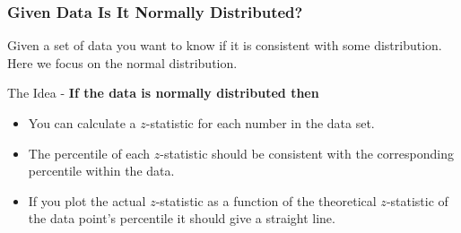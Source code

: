 \begin{frame}
  \frametitle{Given Data Is It Normally Distributed?}

  Given a set of data you want to know if it is consistent with some
  distribution. Here we focus on the normal distribution. 

  The Idea - \textbf{If the data is normally distributed then}
  \begin{itemize}
  \item You can calculate a $z$-statistic for each number in the data
    set.
  \item The percentile of each $z$-statistic should be consistent with
    the corresponding percentile within the data.
  \item If you plot the actual $z$-statistic as a function of the
    theoretical $z$-statistic of the data point's percentile it should
    give a straight line.
  \end{itemize}
  
\end{frame}

